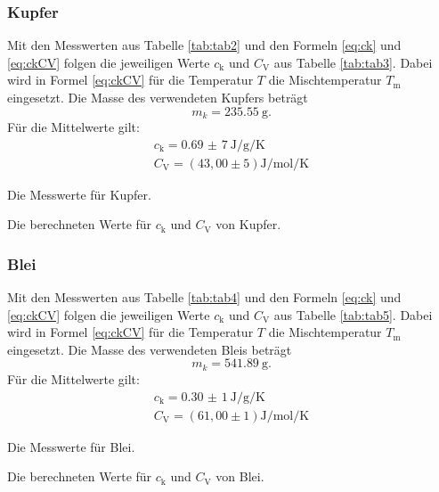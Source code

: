 \subsubsection{Kupfer}

Mit den Messwerten aus Tabelle \ref{tab:tab2} und den Formeln \eqref{eq:ck} und \eqref{eq:ckCV} folgen die jeweiligen Werte $c_\text{k}$ und $C_\text{V}$ aus Tabelle \ref{tab:tab3}. Dabei wird in Formel \eqref{eq:ckCV} für die Temperatur $T$ die Mischtemperatur $T_\text{m}$ eingesetzt. Die Masse des verwendeten Kupfers beträgt \[m_k = \SI{235,55}{\gram}.\]
Für die Mittelwerte gilt:
\begin{align*}
	c_\text{k} = \SI{0,69(7)}{\joule\per\gram\per\kelvin} \\
	C_\text{V} = (43,00\pm5)\si{\joule\per\mol\per\kelvin}
\end{align*}
\begin{table}
	\centering
	\caption{Die Messwerte für Kupfer.}
	
	\label{tab:tab2}
\end{table}
\begin{table}
	\centering
	\caption{Die berechneten Werte für $c_\text{k}$ und $C_\text{V}$ von Kupfer.}
	
	\label{tab:tab3}
\end{table}

\subsubsection{Blei}

Mit den Messwerten aus Tabelle \ref{tab:tab4} und den Formeln \eqref{eq:ck} und \eqref{eq:ckCV} folgen die jeweiligen Werte $c_\text{k}$ und $C_\text{V}$ aus Tabelle \ref{tab:tab5}. Dabei wird in Formel \eqref{eq:ckCV} für die Temperatur $T$ die Mischtemperatur $T_\text{m}$ eingesetzt. Die Masse des verwendeten Bleis beträgt \[m_k = \SI{541,89}{\gram}.\]
Für die Mittelwerte gilt:
\begin{align*}
	c_\text{k} = \SI{0,30(1)}{\joule\per\gram\per\kelvin}\\
	C_\text{V} =(61,00\pm1)\si{\joule\per\mol\per\kelvin}
\end{align*}
\begin{table}
	\centering
	\caption{Die Messwerte für Blei.}
	
	\label{tab:tab4}
\end{table}
\begin{table}
	\centering
	\caption{Die berechneten Werte für $c_\text{k}$ und $C_\text{V}$ von Blei.}
	
	\label{tab:tab5}
\end{table}

